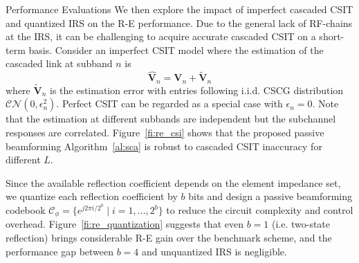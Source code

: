 \documentclass[journal]{IEEEtran}
\begin{document}
\begin{section}{Performance Evaluations}
		We then explore the impact of imperfect cascaded CSIT and quantized IRS on the R-E performance. Due to the general lack of RF-chains at the IRS, it can be challenging to acquire accurate cascaded CSIT on a short-term basis. Consider an imperfect CSIT model where the estimation of the cascaded link at subband $n$ is
		\begin{equation}
			\hat{\boldsymbol{V}}_{n} = \boldsymbol{V}_{n} + \tilde{\boldsymbol{V}}_{n}
		\end{equation}
		where $\tilde{\boldsymbol{V}}_{n}$ is the estimation error with entries following i.i.d. CSCG distribution $\mathcal{CN}(0, \epsilon_{n}^2)$. Perfect CSIT can be regarded as a special case with $\epsilon_{n}=0$. Note that the estimation at different subbands are independent but the subchannel responses are correlated. Figure~\ref{fi:re_csi} shows that the proposed passive beamforming Algorithm~\ref{al:sca} is robust to cascaded CSIT inaccuracy for different $L$.

		Since the available reflection coefficient depends on the element impedance set, we quantize each reflection coefficient by $b$ bits and design a passive beamforming codebook $\mathcal{C}_\phi = \{e^{j 2 \pi i / 2^b} \mid i = 1, \dots, 2^b\}$ to reduce the circuit complexity and control overhead. Figure~\ref{fi:re_quantization} suggests that even $b=1$ (i.e. two-state reflection) brings considerable R-E gain over the benchmark scheme, and the performance gap between $b=4$ and unquantized IRS is negligible.
	\end{section}
\end{document}

